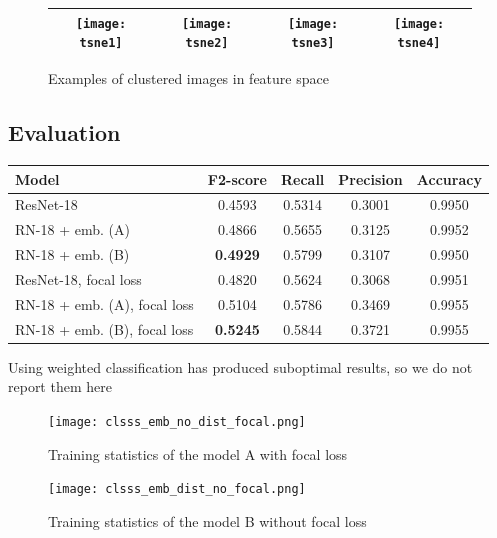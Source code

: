 \documentclass[10pt,twocolumn,letterpaper]{article}
\begin{document}
\begin{figure}[hb!]
	\begin{center}
		\begin{tabular}{|c|c|c|c|}
			\hline
\texttt{[image: tsne1]} &	\texttt{[image: tsne2]} & \texttt{[image: tsne3]} & \texttt{[image: tsne4]} \\
			\hline
	\end{tabular}
	\end{center}
	\caption{Examples of clustered images in feature space}
	\label{fig:tsne}
\end{figure}

\subsection{Evaluation}
    \begin{minipage}[b]{0.5\hsize}\centering
    	\begin{tabular}{|m{1cm}|cccc|}
		\hline
		\textbf{Model} & \textbf{F2-score} & \textbf{Recall}  & \textbf{Precision} & \textbf{Accuracy} \\ \hline \hline
		ResNet-18 & 0.4593 & 0.5314& 0.3001 & 0.9950\\ \hline
		RN-18 + emb. (A) &0.4866 & 0.5655 & 0.3125 &0.9952\\ \hline
		RN-18 + emb. (B) &\textbf{0.4929} & 0.5799 & 0.3107 &0.9950\\ \hline  \hline
		ResNet-18, focal loss & 0.4820 & 0.5624& 0.3068& 0.9951\\ \hline
		RN-18 + emb. (A), focal loss  & 0.5104 & 0.5786& 0.3469 & 0.9955\\ \hline
		RN-18 + emb. (B), focal loss & \textbf{0.5245} & 0.5844&0.3721 & 0.9955\\ \hline
	\end{tabular}
	\label{tab:singlebest}
\end{minipage}
\par Using weighted classification has produced suboptimal results, so we do not report them here
\begin{figure}
	\texttt{[image: clsss\_emb\_no\_dist\_focal.png]}
	\centering
	\caption{Training statistics of the model A with focal loss}\label{fig:stat1}
\end{figure}
\begin{figure}
	\texttt{[image: clsss\_emb\_dist\_no\_focal.png]}
	\centering
	\caption{Training statistics of the model B without focal loss}\label{fig:stat2}
\end{figure}
\end{document}
